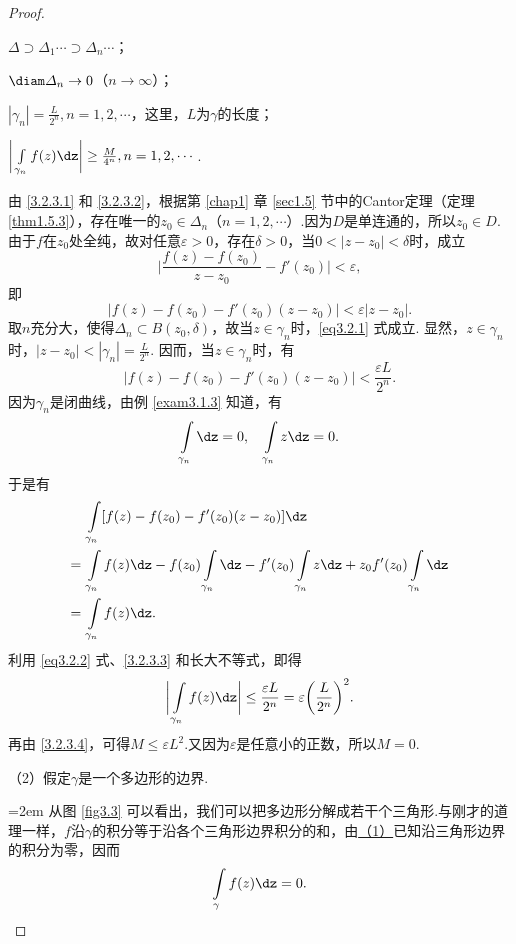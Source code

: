 \begin{proof}
\begin{eenum}
  \item \label{3.2.3.1}$\varDelta\supset\varDelta_1\cdots\supset\varDelta_n\cdots$；
  \item \label{3.2.3.2} $\diam\varDelta_n\to0$（$n\to\infty$）；
  \item \label{3.2.3.3}$|\gamma_n|=\frac{L}{2^n},n=1,2,\cdots$，这里，$L$为$\gamma$的长度；
  \item \label{3.2.3.4}$\bigg|\int\limits_{\gamma_n}f(z)\dz\bigg|\ge\frac M{4^n},n=1,2,\cdots$.
\end{eenum}

由 \ref{3.2.3.1} 和 \ref{3.2.3.2}，根据第 \ref{chap1} 章 \ref{sec1.5} 节中的Cantor定理（定理 \ref{thm1.5.3}），存在唯一的$z_0\in\varDelta_n$（$n=1,2,\cdots$）.因为$D$是单连通的，所以$z_0\in D$. 由于$f$在$z_0$处全纯，故对任意$\varepsilon>0$，存在$\delta>0$，当$0<|z-z_0|<\delta$时，成立
\begin{equation*}
\bigg|\frac{f(z)-f(z_0)}{z-z_0}-f'(z_0)\bigg|<\varepsilon,
\end{equation*}
即
\begin{equation}\label{eq3.2.1}
|f(z)-f(z_0)-f'(z_0)(z-z_0)|<\varepsilon|z-z_0|.
\end{equation}
取$n$充分大，使得$\varDelta_n\subset B(z_0,\delta)$，故当$z\in\gamma_n$时，\eqref{eq3.2.1} 式成立. 显然，$z\in\gamma_n$时，$|z-z_0|<|\gamma_n|=\frac L{2^n}$. 因而，当$z\in\gamma_n$时，有
\begin{equation}\label{eq3.2.2}
|f(z)-f(z_0)-f'(z_0)(z-z_0)|<\frac{\varepsilon L}{2^n}.
\end{equation}
因为$\gamma_n$是闭曲线，由例 \ref{exam3.1.3} 知道，有
\[\int\limits_{\gamma_n}\dz=0,\quad\int\limits_{\gamma_n}z\dz=0.\]
于是有
\begin{align*}
   &\int\limits_{\gamma_n}[f(z)-f(z_0)-f'(z_0)(z-z_0)]\dz\\
={}&\int\limits_{\gamma_n}f(z)\dz-f(z_0)\int\limits_{\gamma_n}\dz
-f'(z_0)\int\limits_{\gamma_n}z\dz+z_0f'(z_0)\int\limits_{\gamma_n}\dz\\
={}&\int\limits_{\gamma_n}f(z)\dz.
\end{align*}
利用 \eqref{eq3.2.2} 式、\ref{3.2.3.3} 和长大不等式，即得
\[\bigg|\int\limits_{\gamma_n}f(z)\dz\bigg|\le\frac{\varepsilon L}{2^n}
  = \varepsilon\bigg(\frac{L}{2^n}\bigg)^2.\]
再由 \ref{3.2.3.4}，可得$M\le\varepsilon L^2$.又因为$\varepsilon$是任意小的正数，所以$M=0$.

（2）假定$\gamma$是一个多边形的边界.\\[2mm]
\noindent\begin{minipage}{0.7\textwidth}\parindent=2em
从图 \ref{fig3.3} 可以看出，我们可以把多边形分解成若干个三角形.与刚才的道理一样，$f$沿$\gamma$的积分等于沿各个三角形边界积分的和，由\hyperlink{thm3.2.3.1}{（1）}已知沿三角形边界的积分为零，因而
\[\int\limits_\gamma f(z)\dz=0.\]


\end{minipage}
\end{proof}
